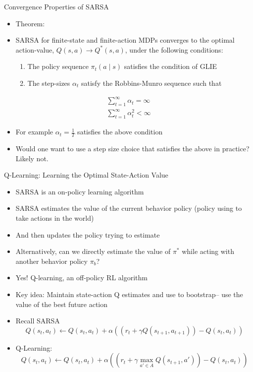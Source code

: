 \begin{frame}[c]{Convergence Properties of SARSA}
	
	\begin{itemize}
		\item Theorem:
		\item SARSA for finite-state and finite-action MDPs converges to the optimal
		action-value, $Q(s, a) \to  Q^*(s, a)$, under the following conditions:
		\begin{enumerate}
			\item The policy sequence $\pi_t(a \mid s)$ satisfies the condition of GLIE
			\item The step-sizes $\alpha_t$ satisfy the \alert{Robbins-Munro sequence} such that
		\end{enumerate}
	\end{itemize}
	\begin{eqnarray}
	\sum_{t=1}^{\infty} \alpha_t = \infty \nonumber \\
	\sum_{t=1}^{\infty} \alpha^2_t < \infty \nonumber
	\end{eqnarray}
	
	\begin{itemize}
		\item For example $\alpha_t= \frac{1}{T}$ satisfies the above condition
		\item Would one want to use a step size choice that satisfies the above in
		practice? Likely not.
	\end{itemize}
	
\end{frame}
\begin{frame}[c]{Q-Learning: Learning the Optimal State-Action Value}
	
	\begin{itemize}
		\item SARSA is an on-policy learning algorithm
		\item SARSA estimates the value of the current behavior policy (policy
		using to take actions in the world)
		\item And then updates the policy trying to estimate
		\item Alternatively, can we directly estimate the value of $\pi^*$ while acting 	with another behavior policy $\pi_b$?
		\item Yes! Q-learning, an off-policy RL algorithm
		\item Key idea: Maintain state-action Q estimates and use to bootstrap–
		use the value of the best future action
		\item Recall SARSA
		$$ Q(s_t, a_t) \gets Q(s_t, a_t) + \alpha((r_t + \gamma Q(s_{t+1}, a_{t+1})) - Q(s_t, a_t))$$
		\item Q-Learning:
		$$Q(s_t, a_t) \gets Q(s_t, a_t) + \alpha((r_t + \gamma \max_{a' \in A}Q(s_{t+1},a')) - Q(s_t, a_t)) $$
	\end{itemize}
	
\end{frame}
